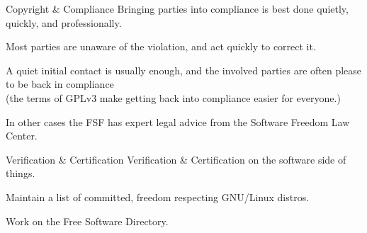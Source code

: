 \documentclass[
  size=12pt,
  style=simple,
  paper=screen
]{powerdot}
\begin{document}
\begin{wideslide}{Copyright \& Compliance}
  Bringing parties into compliance is best done quietly, quickly, and
  professionally.

  \pp

  \begin{itemize}
    \setlength{\itemsep}{1em}

    \nitem Most parties are unaware of the violation, and act quickly
    to correct it.

    \pp

    \nitem A quiet initial contact is usually enough, and the involved
    parties are often please to be back in compliance\pp \\ (the terms of
    GPLv3 make getting back into compliance easier for everyone.)

    \pp

    \nitem In other cases the FSF has expert legal advice from the
    Software Freedom Law Center.

  \end{itemize}
\end{wideslide}

\begin{wideslide}{Verification \& Certification}
  Verification \& Certification on the software side of things.
  \pp

  \begin{itemize}
    \setlength{\itemsep}{1em}

    \nitem Maintain a list of committed, freedom respecting GNU/Linux
    distros.

    \pp

    \nitem Work on the Free Software Directory.

  \end{itemize}
\end{wideslide}
\end{document}
